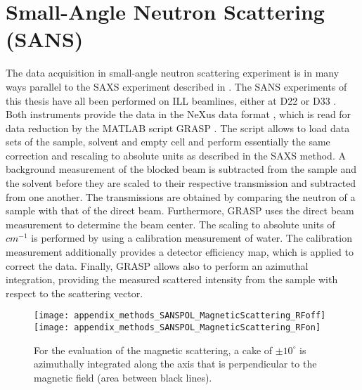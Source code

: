 \documentclass[\main/dresen_thesis.tex]{subfiles}
\begin{document}
  \section{Small-Angle Neutron Scattering (SANS)}
    \label{ch:methods:sans}
    The data acquisition in small-angle neutron scattering experiment is in many ways parallel to the SAXS experiment described in .
    The SANS experiments of this thesis have all been performed on ILL beamlines, either at D22  or D33 .
    Both instruments provide the data in the NeXus data format \cite{Koennecke_2015_Thene}, which is read for data reduction by the MATLAB script GRASP \cite{Dewhurst_2003_Grasp}.
    The script allows to load data sets of the sample, solvent and empty cell and perform essentially the same correction and rescaling to absolute units as described in the SAXS method.
    A background measurement of the blocked beam is subtracted from the sample and the solvent before they are scaled to their respective transmission and subtracted from one another.
    The transmissions are obtained by comparing the neutron of a sample with that of the direct beam.
    Furthermore, GRASP uses the direct beam measurement to determine the beam center.
    The scaling to absolute units of $\unit{cm^{-1}}$ is performed by using a calibration measurement of water.
    The calibration measurement additionally provides a detector efficiency map, which is applied to correct the data.
    Finally, GRASP allows also to perform an azimuthal integration, providing the measured scattered intensity from the sample with respect to the scattering vector.

    \begin{figure}[tb]
      \centering
      \texttt{[image: appendix\_methods\_SANSPOL\_MagneticScattering\_RFoff]}
      \texttt{[image: appendix\_methods\_SANSPOL\_MagneticScattering\_RFon]}
      \caption{\label{fig:methods:sans:sanspolData}For the evaluation of the magnetic scattering, a cake of $\pm 10^\circ$ is azimuthally integrated along the axis that is perpendicular to the magnetic field (area between black lines).}
    \end{figure}
\end{document}
